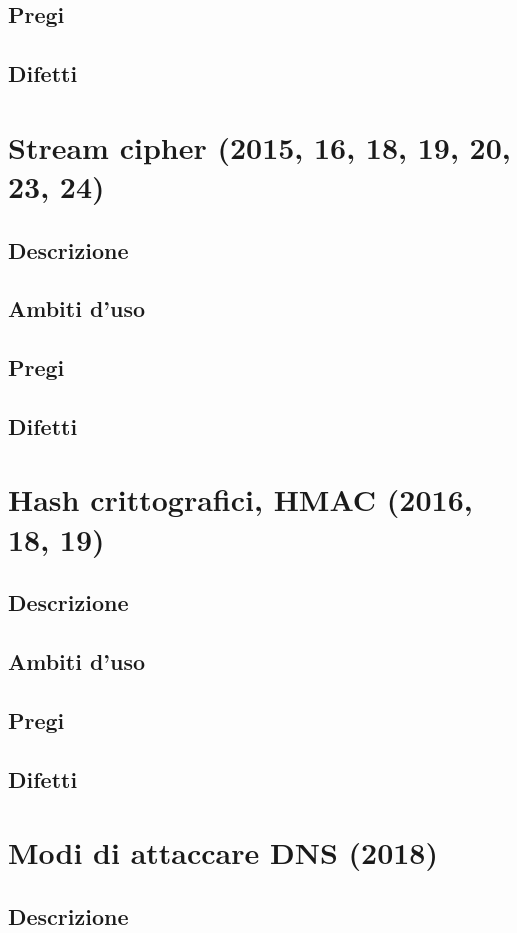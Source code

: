 \documentclass[10pt,oneside,a4paper]{article}
\begin{document}
\subsection{Pregi}
\subsection{Difetti}
\section{Stream cipher (2015, 16, 18, 19, 20, 23, 24)}
\subsection{Descrizione}
\subsection{Ambiti d'uso}
\subsection{Pregi}
\subsection{Difetti}
\section{Hash crittografici, HMAC (2016, 18, 19)}
\subsection{Descrizione}
\subsection{Ambiti d'uso}
\subsection{Pregi}
\subsection{Difetti}
\section{Modi di attaccare DNS (2018)}
\subsection{Descrizione}
\end{document}
